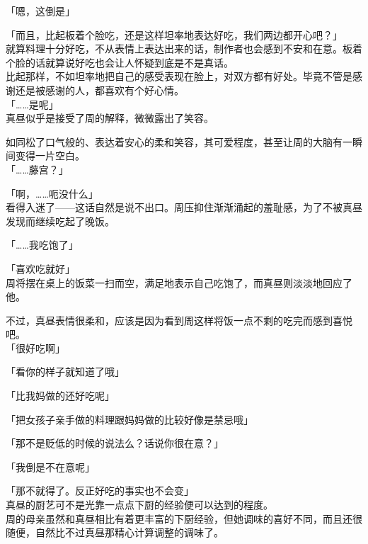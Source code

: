 「嗯，这倒是」

「而且，比起板着个脸吃，还是这样坦率地表达好吃，我们两边都开心吧？」\\

就算料理十分好吃，不从表情上表达出来的话，制作者也会感到不安和在意。板着个脸的话就算说好吃也会让人怀疑到底是不是真话。\\

比起那样，不如坦率地把自己的感受表现在脸上，对双方都有好处。毕竟不管是感谢还是被感谢的人，都喜欢有个好心情。\\

「……是呢」\\

真昼似乎是接受了周的解释，微微露出了笑容。

如同松了口气般的、表达着安心的柔和笑容，其可爱程度，甚至让周的大脑有一瞬间变得一片空白。\\

「……藤宫？」

「啊，……呃没什么」\\

看得入迷了——这话自然是说不出口。周压抑住渐渐涌起的羞耻感，为了不被真昼发现而继续吃起了晚饭。\\

\vspace{2\baselineskip}

「……我吃饱了」

「喜欢吃就好」\\

周将摆在桌上的饭菜一扫而空，满足地表示自己吃饱了，而真昼则淡淡地回应了他。

不过，真昼表情很柔和，应该是因为看到周这样将饭一点不剩的吃完而感到喜悦吧。\\

「很好吃啊」

「看你的样子就知道了哦」

「比我妈做的还好吃呢」

「把女孩子亲手做的料理跟妈妈做的比较好像是禁忌哦」

「那不是贬低的时候的说法么？话说你很在意？」

「我倒是不在意呢」

「那不就得了。反正好吃的事实也不会变」\\

真昼的厨艺可不是光靠一点点下厨的经验便可以达到的程度。\\

周的母亲虽然和真昼相比有着更丰富的下厨经验，但她调味的喜好不同，而且还很随便，自然比不过真昼那精心计算调整的调味了。\\

